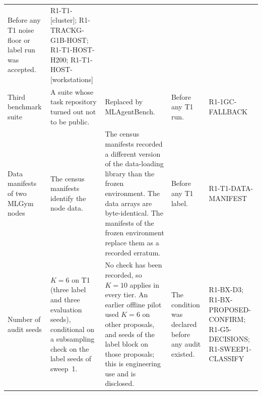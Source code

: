 \begin{table}[t]
\begin{tabular}{L{0.8in}L{1.3in}L{1.9in}L{1.25in}L{0.98in}}
Before any T1 noise floor or label run was accepted. &
R1-T1-[cluster]; R1-TRACKG-G1B-HOST; R1-T1-HOST-H200; R1-T1-HOST-[workstations] \\
\addlinespace
Third benchmark suite &
A suite whose task repository turned out not to be public. &
Replaced by MLAgentBench. &
Before any T1 run. &
R1-1GC-FALLBACK \\
\addlinespace
Data manifests of two MLGym nodes &
The census manifests identify the node data. &
The census manifests recorded a different version of the data-loading library than the frozen environment. The data arrays are byte-identical. The manifests of the frozen environment replace them as a recorded erratum. &
Before any T1 label. &
R1-T1-DATA-MANIFEST \\
\addlinespace
Number of audit seeds &
$K=6$ on T1 (three label and three evaluation seeds), conditional on a subsampling check on the label seeds of sweep~1. &
No check has been recorded, so $K=10$ applies in every tier.  An earlier offline pilot used $K=6$ on other proposals, and seeds of the label block on those proposals; this is engineering use and is disclosed. &
The condition was declared before any audit existed. &
R1-BX-D3; R1-BX-PROPOSED-CONFIRM; R1-G5-DECISIONS; R1-SWEEP1-CLASSIFY \\
\bottomrule
\end{tabular}
\end{table}

